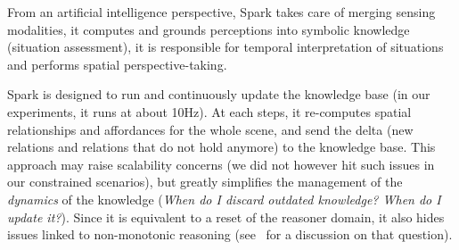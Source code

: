 \documentclass[preprint,3p,times]{elsarticle}
\begin{document}


From an artificial intelligence perspective, {\sc Spark} takes care of merging
sensing modalities, it computes and grounds perceptions into symbolic
knowledge (situation assessment), it is responsible for temporal interpretation of
situations and performs spatial perspective-taking.

{\sc Spark} is designed to run and continuously update the knowledge base (in our
experiments, it runs at about 10Hz). At each steps, it re-computes spatial
relationships and affordances for the whole scene, and send the delta (new
relations and relations that do not hold anymore) to the knowledge base. This
approach may raise scalability concerns (we did not however hit such issues in
our constrained scenarios), but greatly simplifies the management of the
\emph{dynamics} of the knowledge (\emph{When do I discard outdated knowledge?
When do I update it?}). Since it is equivalent to a reset of the reasoner
domain, it also hides issues linked to non-monotonic reasoning
(see~\cite{McCarthy2007} for a discussion on that question).
\end{document}
